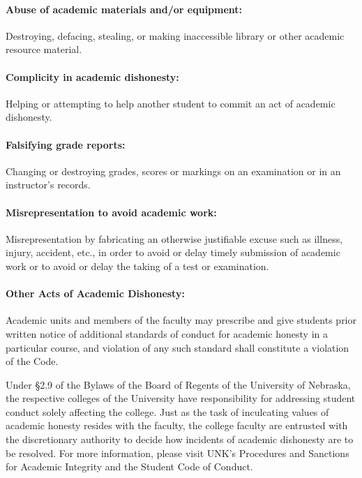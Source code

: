 \documentclass[12pt,fullpage]{article}
\newcounter{ex}\setcounter{ex}{0}
\begin{document}
\paragraph{Abuse of academic materials and/or equipment:} Destroying, defacing, stealing, or making inaccessible library
or other academic resource material.

\paragraph{Complicity in academic dishonesty:} Helping or attempting to help another student to commit an act of
academic dishonesty.

\paragraph{Falsifying grade reports:} Changing or destroying grades, scores or markings on an examination or in an
instructor's records.

\paragraph{Misrepresentation to avoid academic work:} Misrepresentation by fabricating an otherwise justifiable excuse
such as illness, injury, accident, etc., in order to avoid or delay timely submission of academic work or to
avoid or delay the taking of a test or examination.

\paragraph{Other Acts of Academic Dishonesty:} Academic units and members of the faculty may prescribe and give
students prior written notice of additional standards of conduct for academic honesty in a particular course,
and violation of any such standard shall constitute a violation of the Code.

Under \S 2.9 of the Bylaws of the Board of Regents of the University of Nebraska, the respective colleges
of the University have responsibility for addressing student conduct solely affecting the college. Just as the
task of inculcating values of academic honesty resides with the faculty, the college faculty are entrusted with
the discretionary authority to decide how incidents of academic dishonesty are to be resolved. For more
information, please visit UNK's Procedures and Sanctions for Academic Integrity and the Student Code of
Conduct.
\end{document}
